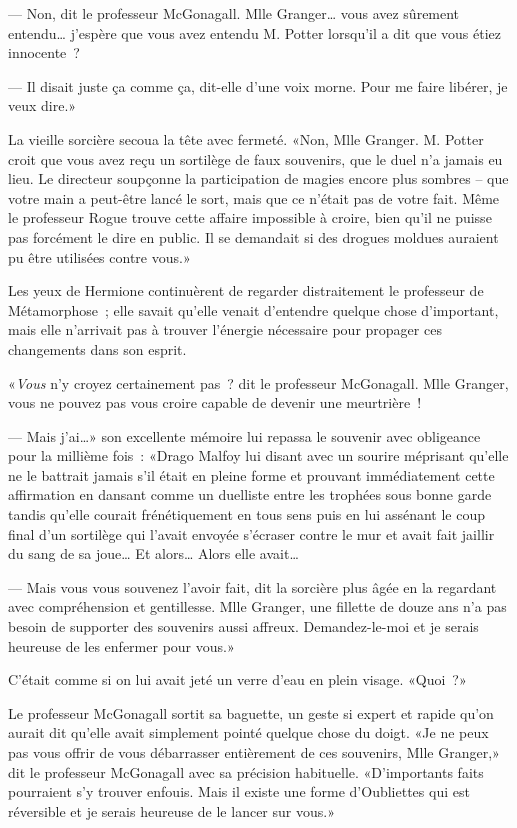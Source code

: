 --- Non, dit le professeur McGonagall. Mlle Granger… vous avez sûrement entendu… j'espère que vous avez entendu M. Potter lorsqu'il a dit que vous étiez innocente~?

--- Il disait juste ça comme ça, dit-elle d'une voix morne. Pour me faire libérer, je veux dire.»

La vieille sorcière secoua la tête avec fermeté. «Non, Mlle Granger. M. Potter croit que vous avez reçu un sortilège de faux souvenirs, que le duel n'a jamais eu lieu. Le directeur soupçonne la participation de magies encore plus sombres -- que votre main a peut-être lancé le sort, mais que ce n'était pas de votre fait. Même le professeur Rogue trouve cette affaire impossible à croire, bien qu'il ne puisse pas forcément le dire en public. Il se demandait si des drogues moldues auraient pu être utilisées contre vous.»

Les yeux de Hermione continuèrent de regarder distraitement le professeur de Métamorphose~; elle savait qu'elle venait d'entendre quelque chose d'important, mais elle n'arrivait pas à trouver l'énergie nécessaire pour propager ces changements dans son esprit.

«\emph{Vous} n'y croyez certainement pas~? dit le professeur McGonagall. Mlle Granger, vous ne pouvez pas vous croire capable de devenir une meurtrière~!

--- Mais j'ai…» son excellente mémoire lui repassa le souvenir avec obligeance pour la millième fois~: «Drago Malfoy lui disant avec un sourire méprisant qu'elle ne le battrait jamais s'il était en pleine forme et prouvant immédiatement cette affirmation en dansant comme un duelliste entre les trophées sous bonne garde tandis qu'elle courait frénétiquement en tous sens puis en lui assénant le coup final d'un sortilège qui l'avait envoyée s'écraser contre le mur et avait fait jaillir du sang de sa joue… Et alors… Alors elle avait…

--- Mais vous vous souvenez l'avoir fait, dit la sorcière plus âgée en la regardant avec compréhension et gentillesse. Mlle Granger, une fillette de douze ans n'a pas besoin de supporter des souvenirs aussi affreux. Demandez-le-moi et je serais heureuse de les enfermer pour vous.»

C'était comme si on lui avait jeté un verre d'eau en plein visage. «Quoi~?»

Le professeur McGonagall sortit sa baguette, un geste si expert et rapide qu'on aurait dit qu'elle avait simplement pointé quelque chose du doigt. «Je ne peux pas vous offrir de vous débarrasser entièrement de ces souvenirs, Mlle Granger,» dit le professeur McGonagall avec sa précision habituelle. «D'importants faits pourraient s'y trouver enfouis. Mais il existe une forme d'Oubliettes qui est réversible et je serais heureuse de le lancer sur vous.»

